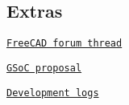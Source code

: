 \subsection*{Extras}


\begin{DoxyItemize}
\item \href{https://forum.freecadweb.org/viewtopic.php?f=8&t=22760}{\tt Free\+C\+AD forum thread}
\item \href{https://brlcad.org/wiki/User:Amritpal_singh/gsoc_proposal}{\tt G\+SoC proposal}
\item \href{https://brlcad.org/wiki/User:Amritpal_singh/GSoC17/logs}{\tt Development logs} 
\end{DoxyItemize}